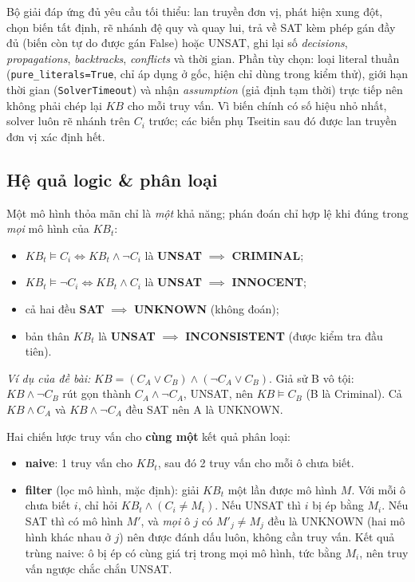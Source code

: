 \documentclass{article}
\newcommand{\code}[1]{\texttt{#1}}
\newcommand{\KB}{\mathit{KB}}
\begin{document}
Bộ giải đáp ứng đủ yêu cầu tối thiểu: lan truyền đơn vị, phát hiện xung đột, chọn biến tất định, rẽ nhánh đệ quy và quay lui, trả về SAT kèm phép gán đầy đủ (biến còn tự do được gán False) hoặc UNSAT, ghi lại số \textit{decisions}, \textit{propagations}, \textit{backtracks}, \textit{conflicts} và thời gian. Phần tùy chọn: loại literal thuần (\code{pure\_literals=True}, chỉ áp dụng ở gốc, hiện chỉ dùng trong kiểm thử), giới hạn thời gian (\code{SolverTimeout}) và nhận \textit{assumption} (giả định tạm thời) trực tiếp nên không phải chép lại $\KB$ cho mỗi truy vấn. Vì biến chính có số hiệu nhỏ nhất, solver luôn rẽ nhánh trên $C_i$ trước; các biến phụ Tseitin sau đó được lan truyền đơn vị xác định hết.

\subsection{Hệ quả logic \& phân loại}\label{sec:entail}
Một mô hình thỏa mãn chỉ là \textit{một} khả năng; phán đoán chỉ hợp lệ khi đúng trong \textit{mọi} mô hình của $\KB_t$:
\begin{itemize}[noitemsep]
    \item $\KB_t \models C_i \iff \KB_t \land \neg C_i$ là \textbf{UNSAT} $\implies$ \textbf{CRIMINAL};
    \item $\KB_t \models \neg C_i \iff \KB_t \land C_i$ là \textbf{UNSAT} $\implies$ \textbf{INNOCENT};
    \item cả hai đều \textbf{SAT} $\implies$ \textbf{UNKNOWN} (không đoán);
    \item bản thân $\KB_t$ là \textbf{UNSAT} $\implies$ \textbf{INCONSISTENT} (được kiểm tra đầu tiên).
\end{itemize}
\textit{Ví dụ của đề bài:} $\KB = (C_A \lor C_B) \land (\neg C_A \lor C_B)$. Giả sử B vô tội: $\KB \land \neg C_B$ rút gọn thành $C_A \land \neg C_A$, UNSAT, nên $\KB \models C_B$ (B là Criminal). Cả $\KB \land C_A$ và $\KB \land \neg C_A$ đều SAT nên A là UNKNOWN.

Hai chiến lược truy vấn cho \textbf{cùng một} kết quả phân loại:
\begin{itemize}
    \item \textbf{naive}: 1 truy vấn cho $\KB_t$, sau đó 2 truy vấn cho mỗi ô chưa biết.
    \item \textbf{filter} (lọc mô hình, mặc định): giải $\KB_t$ một lần được mô hình $M$. Với mỗi ô chưa biết $i$, chỉ hỏi $\KB_t \land (C_i \ne M_i)$. Nếu UNSAT thì $i$ bị ép bằng $M_i$. Nếu SAT thì có mô hình $M'$, và \textit{mọi} ô $j$ có $M'_j \ne M_j$ đều là UNKNOWN (hai mô hình khác nhau ở $j$) nên được đánh dấu luôn, không cần truy vấn. Kết quả trùng naive: ô bị ép có cùng giá trị trong mọi mô hình, tức bằng $M_i$, nên truy vấn ngược chắc chắn UNSAT.
\end{itemize}
\end{document}

